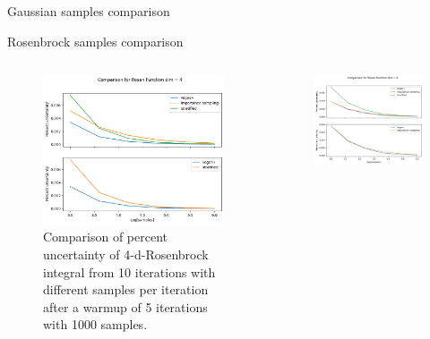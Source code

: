 \documentclass[t,handout,professionalfonts]{beamer}
\begin{document}
\begin{frame}{Gaussian samples comparison}
\end{frame}

\begin{frame}{Rosenbrock samples comparison}
	\vspace{-0.5cm}
	\tiny
	\begin{columns}[T]
		\begin{column}[T]{0.5 \textwidth}
			\begin{figure}
				\includegraphics[width=\columnwidth]{../plots/rosen_samples_symm_dim4_log.png}
				\caption{Comparison of  percent uncertainty of  4-d-Rosenbrock integral from 10 iterations with different samples per iteration after a warmup of 5 iterations with 1000 samples.}
			\end{figure}
		\end{column}
		\begin{column}{0.5 \textwidth}
			\begin{figure}
				\includegraphics[width=\columnwidth]{../plots/rosen_samples_symm_dim8_log.png}

\end{figure}
\end{column}
\end{columns}
\end{frame}
\end{document}

